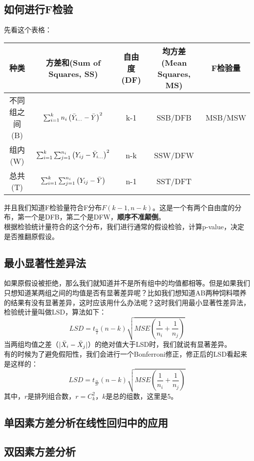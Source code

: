 \documentclass[UTF8]{ctexbook}
\begin{document}
\subsection{如何进行F检验}
先看这个表格：
\begin{center}
    \begin{tabular}{|c|c|c|c|c|}
    \hline\hline
         种类&方差和(Sum of Squares, SS)&自由度(DF)&均方差(Mean Squares, MS)&F检验量 \\\hline
         不同组之间(B)&$\sum_{i=1}^kn_i\left(\Bar{Y}_{i\dots}-\Bar{Y}\right)^2$&k-1&SSB/DFB&MSB/MSW\\\hline
         组内(W)&$\sum_{i=1}^k\sum_{j=1}^{n_i}\left(Y_{ij}-\Bar{Y}_{i\dots}\right)^2$&n-k&SSW/DFW&~\\\hline
         总共(T)&$\sum_{i=1}^k\sum_{j=1}^{n_i}\left(Y_{ij}-\Bar{Y}\right)$&n-1&SST/DFT&~\\ \hline\hline
    \end{tabular}
\end{center}
并且我们知道F检验量符合F分布$F(k-1,n-k)$。这是一个有两个自由度的分布，第一个是DFB，第二个是DFW，\textbf{顺序不准颠倒}。\\
根据检验统计量符合的这个分布，我们进行通常的假设检验，计算p-value，决定是否推翻原假设。
\subsection{最小显著性差异法}
如果原假设被拒绝，那么我们就知道并不是所有组中的均值都相等。但是如果我们只想知道某两组之间的均值是否有显著差异呢？比如我们想知道AB两种饲料喂养的结果有没有显著差异，这时应该用什么办法呢？这时我们用最小显著性差异法，检验统计量叫做LSD，算法如下：
\[
LSD=t_{\frac{\alpha}{2}}(n-k)\sqrt{MSE\left(\frac{1}{n_i}+\frac{1}{n_j}\right)}
\]
当两组均值之差（$|\Bar{X}_i-\Bar{X}_j|$）的绝对值大于LSD时，我们就说有显著差异。\\
有的时候为了避免假阳性，我们会进行一个Bonferroni修正，修正后的LSD看起来是这样的：
\[
LSD=t_{\frac{\alpha}{2r}}(n-k)\sqrt{MSE\left(\frac{1}{n_i}+\frac{1}{n_j}\right)}
\]
其中，$r$是排列组合数，$r=C_k^2$，$k$是总的组数，这里是5。
\subsection{单因素方差分析在线性回归中的应用}

\subsection{双因素方差分析}
\end{document}
